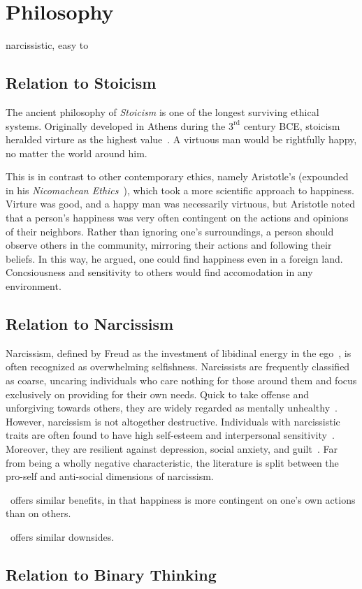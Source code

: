 \section{Philosophy}
\label{philosophy}
narcissistic, easy to 

\subsection{Relation to Stoicism}
The ancient philosophy of \emph{Stoicism} is one of the longest surviving ethical systems.
Originally developed in Athens during the $3^{\text{rd}}$ century BCE, stoicism heralded virture as the highest value~\cite{long1989hellenistic}.
A virtuous man would be rightfully happy, no matter the world around him.

This is in contrast to other contemporary ethics, namely Aristotle's (expounded in his \emph{Nicomachean Ethics}~\cite{ross2009nicomachean}), which took a more scientific approach to happiness.
Virture was good, and a happy man was necessarily virtuous, but Aristotle noted that a person's happiness was very often contingent on the actions and opinions of their neighbors.
Rather than ignoring one's surroundings, a person should observe others in the community, mirroring their actions and following their beliefs.
In this way, he argued, one could find happiness even in a foreign land. 
Concsiousness and sensitivity to others would find accomodation in any environment.


\subsection{Relation to Narcissism}
Narcissism, defined by Freud as the investment of libidinal energy in the ego~\cite{frued}, is often recognized as overwhelming selfishness.
Narcissists are frequently classified as coarse, uncaring individuals who care nothing for those around them and focus exclusively on providing for their own needs.
Quick to take offense and unforgiving towards others, they are widely regarded as mentally unhealthy~\cite{narcissism-today}. 
However, narcissism is not altogether destructive.
Individuals with narcissistic traits are often found to have high self-esteem and interpersonal sensitivity~\cite{watson1992measures,watson1996self,rhodewalt1998narcissism,morf2001unraveling}.
Moreover, they are resilient against depression, social anxiety, and guilt~\cite{campbell2001narcissism}.
Far from being a wholly negative characteristic, the literature is split between the pro-self and anti-social dimensions of narcissism.

\philo~offers similar benefits, in that happiness is more contingent on one's own actions than on others. 

\philo~offers similar downsides.


\subsection{Relation to Binary Thinking}

